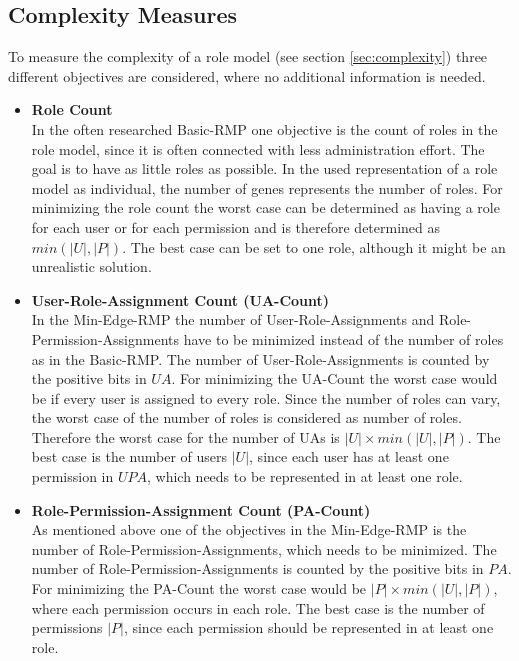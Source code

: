 \begin{itemize}
    	\iffalse \item \textbf{Average Confidentiality Violations and Availability Violations}\\
    	The measure of the average confidentiality violations of roles is combined with the overall availability violations in the role model. As in the other fitness functions, the measures are normalized.\fi
    \end{itemize}
    
    \subsection{Complexity Measures}
    \label{sec:optimizationComplexity}
    To measure the complexity of a role model (see section \ref{sec:complexity}) three different objectives are considered, where no additional information is needed.
    
    \begin{itemize}
    	\item \textbf{Role Count}\\
    	In the often researched Basic-RMP one objective is the count of roles in the role model, since it is often connected with less administration effort. The goal is to have as little roles as possible. In the used representation of a role model as individual, the number of genes represents the number of roles.
    	For minimizing the role count the worst case can be determined as having a role for each user or for each permission and is therefore determined as $min(|U|,|P|)$. The best case can be set to one role, although it might be an unrealistic solution.
    	
    	\item \textbf{User-Role-Assignment Count (UA-Count)}\\
    	In the Min-Edge-RMP the number of User-Role-Assignments and Role-Permission-Assignments have to be minimized instead of the number of roles as in the Basic-RMP. The number of User-Role-Assignments is counted by the positive bits in $UA$. 
    	For minimizing the UA-Count the worst case would be if every user is assigned to every role. Since the number of roles can vary, the worst case of the number of roles is considered as number of roles. Therefore the worst case for the number of UAs is $|U| \times min(|U|,|P|)$. The best case is the number of users $|U|$, since each user has at least one permission in $UPA$, which needs to be represented in at least one role.
    	
    	\item \textbf{Role-Permission-Assignment Count (PA-Count)}\\
    	As mentioned above one of the objectives in the Min-Edge-RMP is the number of Role-Permission-Assignments, which needs to be minimized. The number of Role-Permission-Assignments is counted by the positive bits in $PA$.
    	For minimizing the PA-Count the worst case would be $|P| \times min(|U|,|P|)$, where each permission occurs in each role. The best case is the number of permissions $|P|$, since each permission should be represented in at least one role.
    \end{itemize}
    
